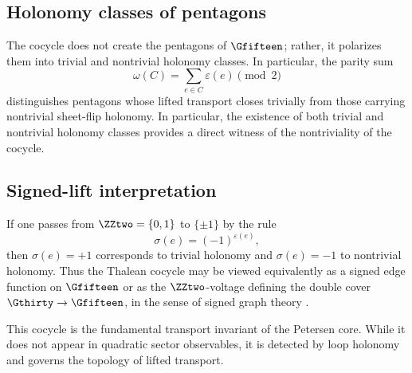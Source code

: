\subsection{Holonomy classes of pentagons}

The cocycle does not create the pentagons of $\Gfifteen$; rather, it
polarizes them into trivial and nontrivial holonomy classes. In
particular, the parity sum
\[
\omega(C)=\sum_{e\in C}\varepsilon(e)\pmod 2
\]
distinguishes pentagons whose lifted transport closes trivially from
those carrying nontrivial sheet-flip holonomy. In particular, the
existence of both trivial and nontrivial holonomy classes provides a
direct witness of the nontriviality of the cocycle.

\subsection{Signed-lift interpretation}

If one passes from $\ZZtwo=\{0,1\}$ to $\{\pm1\}$ by the rule
\[
\sigma(e)=(-1)^{\varepsilon(e)},
\]
then $\sigma(e)=+1$ corresponds to trivial holonomy and
$\sigma(e)=-1$ to nontrivial holonomy. Thus the Thalean cocycle may be
viewed equivalently as a signed edge function on $\Gfifteen$ or as the
$\ZZtwo$-voltage defining the double cover $\Gthirty\to \Gfifteen$, in
the sense of signed graph theory \cite{zaslavsky}.

This cocycle is the fundamental transport invariant of the Petersen
core. While it does not appear in quadratic sector observables, it is
detected by loop holonomy and governs the topology of lifted transport.
